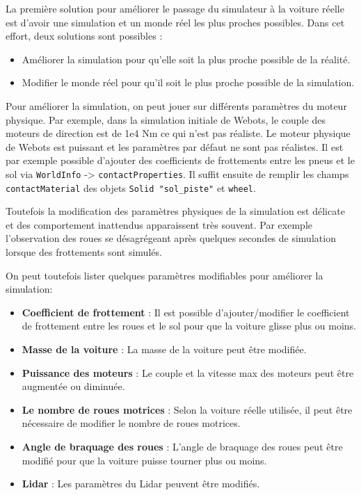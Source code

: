 \documentclass[french]{article}
\begin{document}
La première solution pour améliorer le passage du simulateur à la voiture réelle est d'avoir une simulation et un monde réel les plus proches possibles. Dans cet effort, deux solutions sont possibles :
\begin{itemize}
    \item Améliorer la simulation pour qu'elle soit la plus proche possible de la réalité.
    \item Modifier le monde réel pour qu'il soit le plus proche possible de la simulation.
\end{itemize}

\vspace{0.5cm}
Pour améliorer la simulation, on peut jouer sur différents paramètres du moteur physique. Par exemple, dans la simulation initiale de Webots, le couple des moteurs de direction est de 1e4 Nm ce qui n'est pas réaliste.
Le moteur physique de Webots est puissant et les paramètres par défaut ne sont pas réalistes.
Il est par exemple possible d'ajouter des coefficients de frottements entre les pneus et le sol via \verb|WorldInfo| -> \verb|contactProperties|. Il suffit ensuite de remplir les champs \verb|contactMaterial| des objets \verb|Solid "sol_piste"| et \verb|wheel|.
\vspace*{0.5cm}

Toutefois la modification des paramètres physiques de la simulation est délicate et des comportement inattendus apparaissent très souvent. Par exemple l'observation des roues se désagrégeant après quelques secondes de simulation lorsque des frottements sont simulés.
\vspace*{0.5cm}

On peut toutefois lister quelques paramètres modifiables pour améliorer la simulation:
\begin{itemize}
    \item \textbf{Coefficient de frottement} : Il est possible d'ajouter/modifier le coefficient de frottement entre les roues et le sol pour que la voiture glisse plus ou moins.
    \item \textbf{Masse de la voiture} : La masse de la voiture peut être modifiée.
    \item \textbf{Puissance des moteurs} : Le couple et la vitesse max des moteurs peut être augmentée ou diminuée.
    \item \textbf{Le nombre de roues motrices} : Selon la voiture réelle utilisée, il peut être nécessaire de modifier le nombre de roues motrices.
    \item \textbf{Angle de braquage des roues} : L'angle de braquage des roues peut être modifié pour que la voiture puisse tourner plus ou moins.
    \item \textbf{Lidar} : Les paramètres du Lidar peuvent être modifiés.
\end{itemize} 
\end{document}
